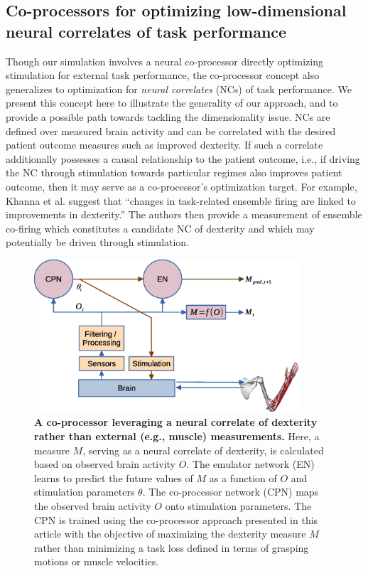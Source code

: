 \documentclass[12pt]{iopart}
\begin{document}
\subsection{Co-processors for optimizing low-dimensional neural correlates of task performance}
Though our simulation involves a neural co-processor directly optimizing stimulation for
external task performance, the co-processor concept also generalizes to optimization for
\textit{neural correlates} (NCs) of task performance. We present this concept here to illustrate
the generality of our approach, and to provide a possible path towards tackling the dimensionality issue.
NCs are defined over measured brain activity and can be correlated with the desired patient outcome measures
such as improved dexterity. If such a correlate additionally possesses a causal relationship to the patient
outcome, i.e., if driving the NC through stimulation towards particular regimes also improves patient outcome,
then it may serve as a co-processor's optimization target. For example, Khanna et al. \cite{khanna.openloop}
suggest that ``changes in task-related ensemble firing are linked to improvements in dexterity.''
The authors then provide a measurement of ensemble co-firing which constitutes a candidate NC of dexterity
and which may potentially be driven through stimulation.

\begin{figure}[h]
	\centering
	\includegraphics[width=0.88\textwidth]{cofiring_model.eps}
	\caption{\textbf{A co-processor leveraging a neural correlate of dexterity rather
    than external (e.g., muscle) measurements.} Here, a measure $M$, serving as a neural correlate of
    dexterity, is calculated based on observed brain activity $O$. The emulator network (EN) learns
    to predict the future values of $M$ as a function of $O$ and stimulation parameters
     $\theta$. The co-processor network (CPN) maps the observed brain activity $O$ onto stimulation
    parameters. The CPN is trained using the co-processor approach presented in this article with the
    objective of maximizing the dexterity measure $M$ rather than minimizing a task loss defined in terms
    of grasping motions or muscle velocities.}
	\label{fig:correlate}
\end{figure}
\end{document}
